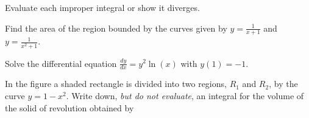 \documentclass[12pt,addpoints]{exam}
\begin{document}
\begin{questions}
\question Evaluate each improper integral or show it diverges. 

\begin{minipage}[t]{0.55\textwidth}
\question[4] Find the area of the region bounded by the curves given by $y=\frac{1}{x+1}$ and $y=\frac{1}{x^2+1}$.
\end{minipage}
\begin{minipage}[t]{0.4\textwidth}
\begin{center}
\end{center}
\end{minipage}

\question[5] Solve the differential equation $\frac{dy}{dx} = y^2\ln(x)$ with $y(1)=-1$. 

\begin{minipage}[t]{0.55\textwidth}
\question In the figure a shaded rectangle is divided into two regions, $R_1$ and $R_2$, by the curve $y=1-x^2$. 
Write down, \textsl{but do not evaluate}, an integral for the volume of the solid of revolution obtained by 
\vspace{5pt}
\end{minipage}
\end{questions}
\end{document}
